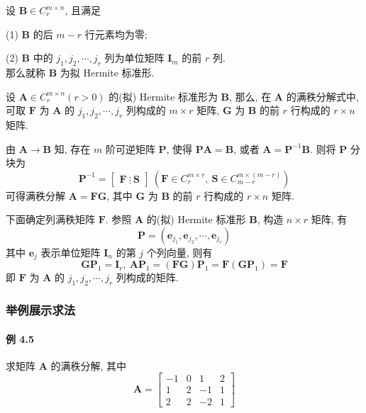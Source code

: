 \par 设 $\bm{B} \in C^{m\times n}_r$, 且满足
\par (1) $\bm{B}$ 的后 $m-r$ 行元素均为零;
\par (2) $\bm{B}$ 中的 $j_1, j_2, \cdots, j_r$ 列为单位矩阵 $\bm{I}_m$ 的前 $r$ 列.
\\ 那么就称 $\bm{B}$ 为拟 Hermite 标准形.

\par 设 $\bm{A} \in C^{m\times n}_r (r > 0)$ 的(拟) Hermite 标准形为 $\bm{B}$, 那么, 在 $\bm{A}$ 的满秩分解式中, 可取
$\bm{F}$ 为 $\bm{A}$ 的 $j_1, j_2, \cdots, j_r$ 列构成的 $m\times r$ 矩阵, $\bm{G}$ 为 $\bm{B}$ 的前 $r$ 行构成的 $r\times n$ 矩阵.

\par 由 $\bm{A} \to \bm{B}$ 知, 存在 $m$ 阶可逆矩阵 $\bm{P}$, 使得 $\bm{PA} = \bm{B}$, 或者 $\bm{A} = \bm{P}^{-1}\bm{B}$. 则将 $\bm{P}$ 分块为
$$
    \bm{P}^{-1} = \begin{bmatrix}
        \bm{F} \ \vdots\  \bm{S}
    \end{bmatrix}\ (\bm{F} \in C^{m\times r}_r, \ \bm{S} \in C^{m\times(m-r)}_{m-r})
$$
可得满秩分解 $\bm{A} = \bm{FG}$, 其中 $\bm{G}$ 为 $\bm{B}$ 的前 $r$ 行构成的 $r\times n$ 矩阵.
\par 下面确定列满秩矩阵 $\bm{F}$. 参照 $\bm{A}$ 的(拟) Hermite 标准形 $\bm{B}$, 构造 $n\times r$ 矩阵, 有
$$
    \bm{P} = (\bm{e}_{j_1}, \bm{e}_{j_2}, \cdots, \bm{e}_{j_r})
$$
其中 $\bm{e}_{j}$ 表示单位矩阵 $\bm{I}_n$ 的第 $j$ 个列向量, 则有
$$
    \bm{GP}_1 = \bm{I}_r, \ \bm{AP}_1 = (\bm{FG})\bm{P}_1 = \bm{F}(\bm{GP}_1) = \bm{F}
$$
即 $\bm{F}$ 为 $\bm{A}$ 的 $j_1, j_2, \cdots, j_r$ 列构成的矩阵.

\subsubsection{举例展示求法}

\paragraph*{例 4.5} 求矩阵 $\bm{A}$ 的满秩分解, 其中
$$
    \bm{A} = \begin{bmatrix}
        -1 & 0 & 1  & 2 \\
        1  & 2 & -1 & 1 \\
        2  & 2 & -2 & 1
    \end{bmatrix}
$$

